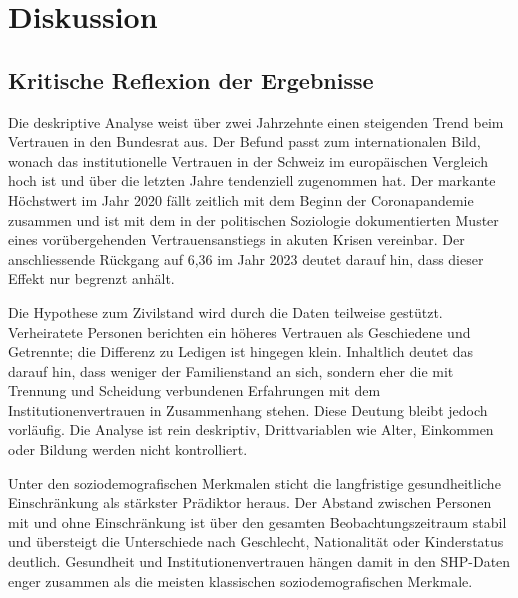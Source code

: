 

\chapter{Diskussion}
\label{Chapter4}


\section{Kritische Reflexion der Ergebnisse}
\label{sec:reflexion}

Die deskriptive Analyse weist über zwei Jahrzehnte einen steigenden Trend beim
Vertrauen in den Bundesrat aus. Der Befund passt zum internationalen Bild, wonach das
institutionelle Vertrauen in der Schweiz im europäischen Vergleich hoch ist und über
die letzten Jahre tendenziell zugenommen hat. Der markante Höchstwert im Jahr 2020
fällt zeitlich mit dem Beginn der Coronapandemie zusammen und ist mit dem in der
politischen Soziologie dokumentierten Muster eines vorübergehenden
Vertrauensanstiegs in akuten Krisen vereinbar. Der anschliessende Rückgang auf
6{,}36 im Jahr 2023 deutet darauf hin, dass dieser Effekt nur begrenzt anhält.

Die Hypothese zum Zivilstand wird durch die Daten teilweise gestützt. Verheiratete
Personen berichten ein höheres Vertrauen als Geschiedene und Getrennte; die Differenz
zu Ledigen ist hingegen klein. Inhaltlich deutet das darauf hin, dass weniger der
Familienstand an sich, sondern eher die mit Trennung und Scheidung verbundenen
Erfahrungen mit dem Institutionenvertrauen in Zusammenhang stehen. Diese Deutung
bleibt jedoch vorläufig. Die Analyse ist rein deskriptiv, Drittvariablen wie Alter,
Einkommen oder Bildung werden nicht kontrolliert.

Unter den soziodemografischen Merkmalen sticht die langfristige gesundheitliche
Einschränkung als stärkster Prädiktor heraus. Der Abstand zwischen
Personen mit und ohne Einschränkung ist über den gesamten Beobachtungszeitraum stabil
und übersteigt die Unterschiede nach Geschlecht, Nationalität oder Kinderstatus
deutlich. Gesundheit und Institutionenvertrauen hängen damit in den SHP-Daten enger
zusammen als die meisten klassischen soziodemografischen Merkmale.


